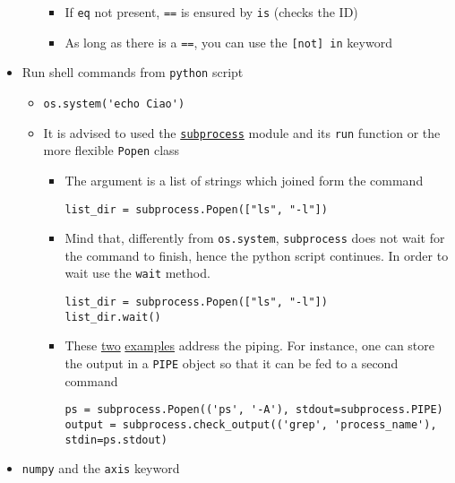 \documentclass[a4paper,12pt,%
              final%
              ]{article}
\begin{document}
\begin{itemize}
\begin{itemize}
        \begin{itemize}
          \item If \texttt{eq} not present, \texttt{==} is ensured by \texttt{is} (checks the ID)
          \item As long as there is a \texttt{==}, you can use the \verb|[not] in| keyword
        \end{itemize}
    \end{itemize}
  \item Run shell commands from \texttt{python} script
    \begin{itemize}
      \item \verb|os.system('echo Ciao')|
      \item It is advised to used the \href{https://docs.python.org/3/library/subprocess.html#subprocess.Popen.communicate}{\texttt{subprocess}} module and its \texttt{run} function or the more flexible \texttt{Popen} class
        \begin{itemize}
          \item The argument is a list of strings which joined form the command
\begin{verbatim}
list_dir = subprocess.Popen(["ls", "-l"])
\end{verbatim}
          \item Mind that, differently from \verb|os.system|, \texttt{subprocess} does not wait for the command to finish, hence the python script continues. In order to wait use the \texttt{wait} method.
\begin{verbatim}
list_dir = subprocess.Popen(["ls", "-l"])
list_dir.wait()
\end{verbatim}
          \item These \href{https://stackoverflow.com/questions/13332268/how-to-use-subprocess-command-with-pipes}{two} \href{https://stackoverflow.com/questions/295459/how-do-i-use-subprocess-popen-to-connect-multiple-processes-by-pipes}{examples} address the piping. For instance, one can store the output in a \texttt{PIPE} object so that it can be fed to a second command
\begin{verbatim}
ps = subprocess.Popen(('ps', '-A'), stdout=subprocess.PIPE)
output = subprocess.check_output(('grep', 'process_name'), stdin=ps.stdout)
\end{verbatim}
        \end{itemize}
    \end{itemize}
  \item \texttt{numpy} and the \texttt{axis} keyword
    \begin{itemize}

\end{itemize}
\end{itemize}
\end{document}
